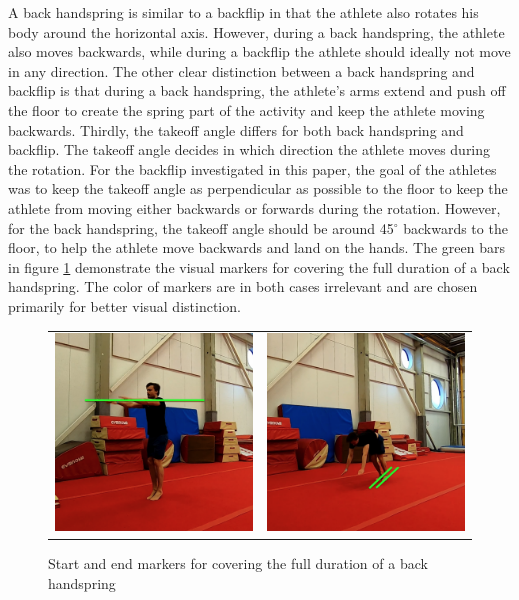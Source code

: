 A back handspring is similar to a backflip in that the athlete also rotates his body around the horizontal axis. However, during a back handspring, the athlete also moves backwards, while during a backflip the athlete should ideally not move in any direction. The other clear distinction between a back handspring and backflip is that during a back handspring, the athlete's arms extend and push off the floor to create the spring part of the activity and keep the athlete moving backwards. Thirdly, the takeoff angle differs for both back handspring and backflip. The takeoff angle decides in which direction the athlete moves during the rotation. For the backflip investigated in this paper, the goal of the athletes was to keep the takeoff angle as perpendicular as possible to the floor to keep the athlete from moving either backwards or forwards during the rotation. However, for the back handspring, the takeoff angle should be around 45$^{\circ}$ backwards to the floor, to help the athlete move backwards and land on the hands. The green bars in figure \ref{example-back-handspring-markers} demonstrate the visual markers for covering the full duration of a back handspring. The color of markers are in both cases irrelevant and are chosen primarily for better visual distinction.

\begin{figure}
   \centering
\begin{tabular}{cc}
\includegraphics[width=7cm]{images/data-acquisition/example-flack-marker-start}&
\includegraphics[width=7cm]{images/data-acquisition/example-flack-marker-end}\\
\end{tabular}
    \caption{Start and end markers for covering the full duration of a back handspring}
    \label{example-back-handspring-markers}
\end{figure}

